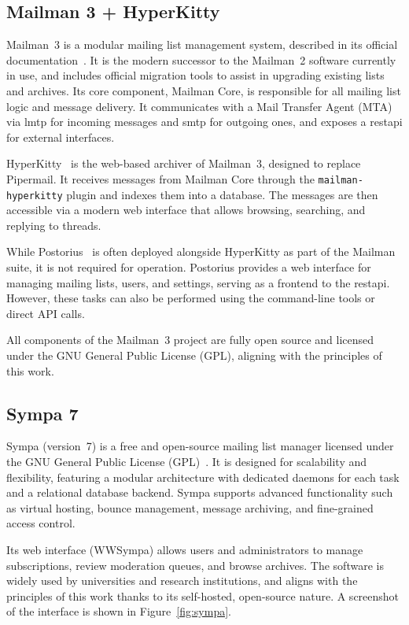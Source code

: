 \subsection*{Mailman 3 + HyperKitty}

Mailman~3 is a modular mailing list management system, described in its official documentation~\cite{mailman-install-docs}. It is the modern successor to the Mailman~2 software currently in use, and includes official migration tools to assist in upgrading existing lists and archives. Its core component, Mailman Core, is responsible for all mailing list logic and message delivery. It communicates with a Mail Transfer Agent (MTA) via \gls{lmtp} for incoming messages and \gls{smtp} for outgoing ones, and exposes a \gls{restapi} for external interfaces.

HyperKitty~\cite{hyperkitty-docs} is the web-based archiver of Mailman~3, designed to replace Pipermail. It receives messages from Mailman Core through the \texttt{mailman-hyperkitty} plugin and indexes them into a database. The messages are then accessible via a modern web interface that allows browsing, searching, and replying to threads.

While Postorius~\cite{postorius-docs} is often deployed alongside HyperKitty as part of the Mailman suite, it is not required for operation. Postorius provides a web interface for managing mailing lists, users, and settings, serving as a frontend to the \gls{restapi}. However, these tasks can also be performed using the command-line tools or direct API calls.

All components of the Mailman~3 project are fully open source and licensed under the GNU General Public License (GPL), aligning with the principles of this work.

\subsection*{Sympa 7}

Sympa (version~7) is a free and open-source mailing list manager licensed under the GNU General Public License (GPL)~\cite{sympa-docs}. It is designed for scalability and flexibility, featuring a modular architecture with dedicated daemons for each task and a relational database backend. Sympa supports advanced functionality such as virtual hosting, bounce management, message archiving, and fine-grained access control.

Its web interface (WWSympa) allows users and administrators to manage subscriptions, review moderation queues, and browse archives. The software is widely used by universities and research institutions, and aligns with the principles of this work thanks to its self-hosted, open-source nature. A screenshot of the interface is shown in Figure~\ref{fig:sympa}.

